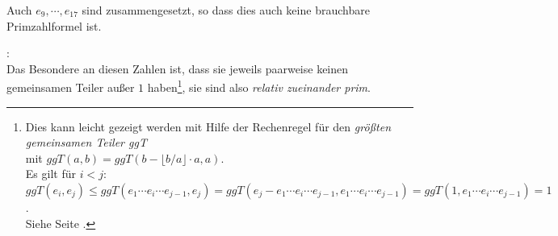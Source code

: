 \begin{refsegment}
 Auch $e_9, \cdots, e_{17}$ sind zusammengesetzt, so dass dies auch
keine brauchbare Primzahlformel ist.

\begin{remark}{:}\\
Das Besondere an diesen Zahlen ist, dass sie jeweils paarweise
keinen gemeinsamen Teiler außer $1$ haben\footnote{%
Dies kann leicht gezeigt werden mit Hilfe der Rechenregel für den
{\em größten gemeinsamen Teiler ggT} \\
mit $ggT(a,b) = ggT(b-\lfloor b/a\rfloor \cdot a, a)$.\\
Es gilt für $i<j$: \\
$ggT(e_i,e_j) \le ggT(e_1 \cdots e_i \cdots e_{j-1}, e_j) = ggT(e_j - e_1 \cdots e_i \cdots e_{j-1}, e_1 \cdots e_i \cdots e_{j-1})
= ggT(1, e_1 \cdots e_i \cdots e_{j-1}) = 1$.\\
Siehe Seite \pageref{nt:NumberTheory_Appendix_GCD}.  %
}, sie sind also%
 {\em relativ zueinander prim}.
\end{remark}


\end{refsegment}

